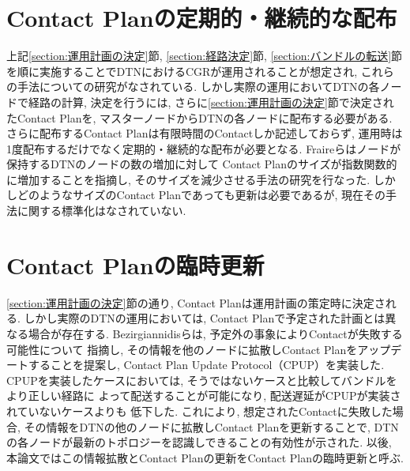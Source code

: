 \section{Contact Planの定期的・継続的な配布}
\label{section:Contact Planの定期的・継続的な配布}

上記\ref{section:運用計画の決定}節, \ref{section:経路決定}節, \ref{section:バンドルの転送}節
を順に実施することでDTNにおけるCGRが運用されることが想定され, 
これらの手法についての研究がなされている.  
しかし実際の運用においてDTNの各ノードで経路の計算, 決定を行うには, 
さらに\ref{section:運用計画の決定}節で決定されたContact Planを, 
マスターノードからDTNの各ノードに配布する必要がある.  
さらに配布するContact Planは有限時間のContactしか記述しておらず, 
運用時は1度配布するだけでなく定期的・継続的な配布が必要となる.  
Fraireらはノードが保持するDTNのノードの数の増加に対して
Contact Planのサイズが指数関数的に増加することを指摘し, 
そのサイズを減少させる手法の研究を行なった\cite{FRAIRE2018}.  
しかしどのようなサイズのContact Planであっても更新は必要であるが, 
現在その手法に関する標準化はなされていない.  

\section{Contact Planの臨時更新}
\label{section:ContactPlanの臨時更新}
\ref{section:運用計画の決定}節の通り, Contact Planは運用計画の策定時に決定される.  
しかし実際のDTNの運用においては, Contact Planで予定された計画とは異なる場合が存在する.  
Bezirgiannidisらは, 予定外の事象によりContactが失敗する可能性について
指摘し, その情報を他のノードに拡散しContact Planをアップデートすることを提案し, 
Contact Plan Update Protocol（CPUP）を実装した\cite{Bezirgiannidis2013}.  
CPUPを実装したケースにおいては, そうではないケースと比較してバンドルをより正しい経路に
よって配送することが可能になり, 配送遅延がCPUPが実装されていないケースよりも
低下した.  これにより, 想定されたContactに失敗した場合, 
その情報をDTNの他のノードに拡散しContact Planを更新することで, 
DTNの各ノードが最新のトポロジーを認識しできることの有効性が示された.  
以後, 本論文ではこの情報拡散とContact Planの更新をContact Planの臨時更新と呼ぶ.  


